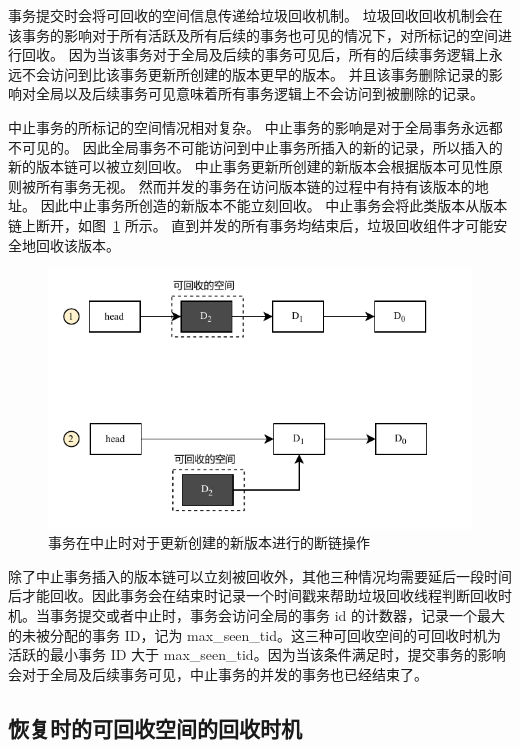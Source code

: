 事务提交时会将可回收的空间信息传递给垃圾回收机制。
垃圾回收回收机制会在该事务的影响对于所有活跃及所有后续的事务也可见的情况下，对所标记的空间进行回收。
因为当该事务对于全局及后续的事务可见后，所有的后续事务逻辑上永远不会访问到比该事务更新所创建的版本更早的版本。
并且该事务删除记录的影响对全局以及后续事务可见意味着所有事务逻辑上不会访问到被删除的记录。

中止事务的所标记的空间情况相对复杂。
中止事务的影响是对于全局事务永远都不可见的。
因此全局事务不可能访问到中止事务所插入的新的记录，所以插入的新的版本链可以被立刻回收。
中止事务更新所创建的新版本会根据版本可见性原则被所有事务无视。
然而并发的事务在访问版本链的过程中有持有该版本的地址。
因此中止事务所创造的新版本不能立刻回收。
中止事务会将此类版本从版本链上断开，如图~\ref{fig:insert-abort} 所示。
直到并发的所有事务均结束后，垃圾回收组件才可能安全地回收该版本。

\begin{figure}
    \centering
    \includegraphics[width=1\linewidth]{figures/gc-e.pdf}
    \caption{事务在中止时对于更新创建的新版本进行的断链操作}
    \label{fig:insert-abort}
\end{figure}

除了中止事务插入的版本链可以立刻被回收外，其他三种情况均需要延后一段时间后才能回收。因此事务会在结束时记录一个时间戳来帮助垃圾回收线程判断回收时机。当事务提交或者中止时，事务会访问全局的事务 id 的计数器，记录一个最大的未被分配的事务 ID，记为 max\_seen\_tid。这三种可回收空间的可回收时机为活跃的最小事务 ID 大于 max\_seen\_tid。因为当该条件满足时，提交事务的影响会对于全局及后续事务可见，中止事务的并发的事务也已经结束了。

\subsection{恢复时的可回收空间的回收时机}


